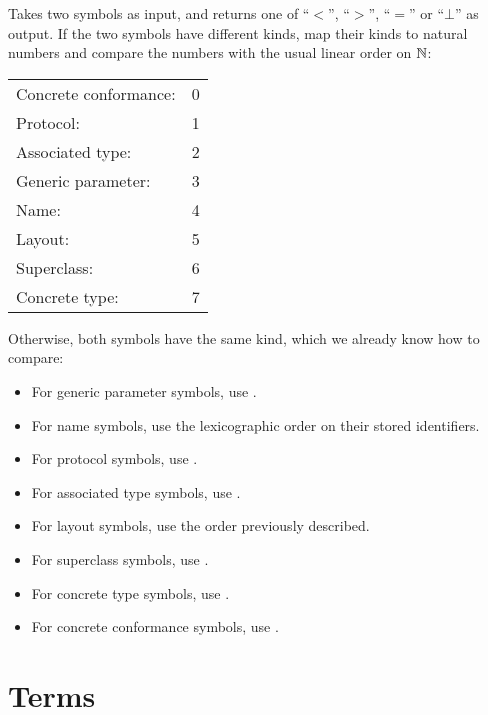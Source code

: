 \documentclass[../generics]{subfiles}
\begin{document}
\begin{algorithm}\label{symbol reduction order}
Takes two symbols as input, and returns one of ``$<$'', ``$>$'', ``$=$'' or ``$\bot$'' as output. If the two symbols have different kinds, map their kinds to natural numbers and compare the numbers with the usual linear order on $\mathbb{N}$:
\begin{center}
\begin{tabular}{ll}
\toprule
Concrete conformance:&0\\
Protocol:&1\\
Associated type:&2\\
Generic parameter:&3\\
Name:&4\\
Layout:&5\\
Superclass:&6\\
Concrete type:&7\\
\bottomrule
\end{tabular}
\end{center}
Otherwise, both symbols have the same kind, which we already know how to compare:
\begin{itemize}
\item For generic parameter symbols, use .
\item For name symbols, use the lexicographic order on their stored identifiers.
\item For protocol symbols, use .
\item For associated type symbols, use .
\item For layout symbols, use the order previously described.
\item For superclass symbols, use .
\item For concrete type symbols, use .
\item For concrete conformance symbols, use .
\end{itemize}
\end{algorithm}

\section{Terms}\label{building terms}
\end{document}
